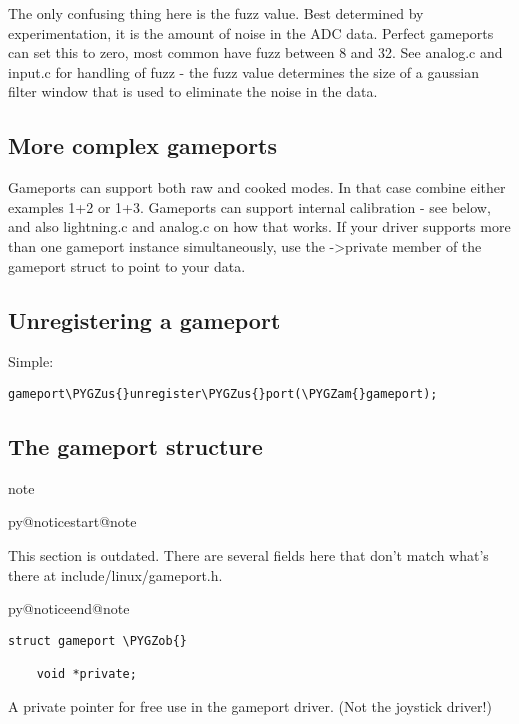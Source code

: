 \documentclass[a4paper,8pt,english]{sphinxmanual}
\makeatletter
\renewenvironment{notice}[2]{%
          \def\py@noticetype{#1}
          \begin{coloredbox}{#1}
          \bf\it
          \par\strong{#2}
          \csname py@noticestart@#1\endcsname
        }
	{
          \csname py@noticeend@\py@noticetype\endcsname
          \end{coloredbox}
        }
\def\PYGZus{\char`\_}
\def\PYGZob{\char`\{}
\def\PYGZam{\char`\&}
\makeatother
\begin{document}
The only confusing thing here is the fuzz value. Best determined by
experimentation, it is the amount of noise in the ADC data. Perfect
gameports can set this to zero, most common have fuzz between 8 and 32.
See analog.c and input.c for handling of fuzz - the fuzz value determines
the size of a gaussian filter window that is used to eliminate the noise
in the data.


\subsection{More complex gameports}
\label{input/gameport-programming:more-complex-gameports}
Gameports can support both raw and cooked modes. In that case combine either
examples 1+2 or 1+3. Gameports can support internal calibration - see below,
and also lightning.c and analog.c on how that works. If your driver supports
more than one gameport instance simultaneously, use the -\textgreater{}private member of
the gameport struct to point to your data.


\subsection{Unregistering a gameport}
\label{input/gameport-programming:unregistering-a-gameport}
Simple:

\begin{Verbatim}[commandchars=\\\{\}]
gameport\PYGZus{}unregister\PYGZus{}port(\PYGZam{}gameport);
\end{Verbatim}


\subsection{The gameport structure}
\label{input/gameport-programming:the-gameport-structure}
\begin{notice}{note}{Note:}
This section is outdated. There are several fields here that don't
match what's there at include/linux/gameport.h.
\end{notice}

\begin{Verbatim}[commandchars=\\\{\}]
struct gameport \PYGZob{}

    void *private;
\end{Verbatim}

A private pointer for free use in the gameport driver. (Not the joystick
driver!)
\end{document}
